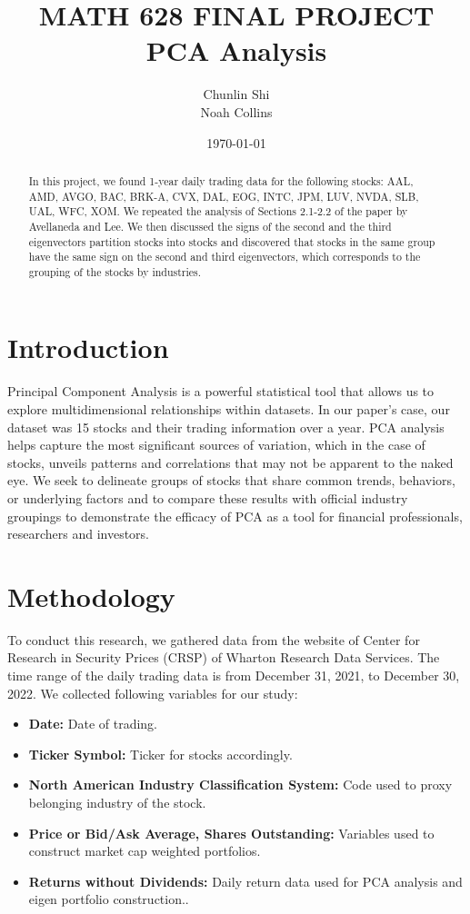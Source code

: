 \documentclass[12pt, letterpaper, twoside]{article}
\title{MATH 628 FINAL PROJECT\\PCA Analysis}
\author{Chunlin Shi\\Noah Collins}
\date{\today}
\begin{document}
    \maketitle

    \begin{abstract}
        In this project, we found 1-year daily trading 
        data for the following stocks: AAL, AMD, 
        AVGO, BAC, BRK-A, CVX, DAL, EOG, INTC, JPM, 
        LUV, NVDA, SLB, UAL, WFC, XOM. 
        We repeated the analysis of 
        Sections 2.1-2.2 of the paper by 
        Avellaneda and Lee. 
        We then discussed the signs of the second 
        and the third eigenvectors partition stocks 
        into stocks and discovered that stocks in the 
        same group have the same sign on the second 
        and third eigenvectors, which corresponds to 
        the grouping of the stocks by industries. 
    \end{abstract}

    \section{Introduction}
    Principal Component Analysis is a powerful statistical 
    tool that allows us to explore multidimensional 
    relationships within datasets. 
    In our paper's case, our dataset was 15 stocks 
    and their trading information over a year. 
    PCA analysis helps capture the most significant 
    sources of variation, which in the case of stocks, 
    unveils patterns and correlations that may not be 
    apparent to the naked eye. We seek to delineate groups
    of stocks that share common trends, behaviors, or 
    underlying factors and to compare these results with 
    official industry groupings to demonstrate the 
    efficacy of PCA as a tool for financial 
    professionals, researchers and investors.

    \section{Methodology}
    To conduct this research, 
    we gathered data from the website of Center for 
    Research in Security Prices (CRSP) of 
    Wharton Research Data Services. 
    The time range of the daily trading data is 
    from December 31, 2021, to December 30, 2022. 
    We collected following variables for our study:

    \begin{itemize}
        \item \textbf{Date:}  Date of trading.
        \item \textbf{Ticker Symbol:} Ticker for stocks accordingly.
        \item \textbf{North American Industry Classification System:} 
        Code used to proxy belonging industry of the stock.
        \item \textbf{Price or Bid/Ask Average, Shares Outstanding:} 
        Variables used to construct market cap weighted 
        portfolios.
        \item \textbf{Returns without Dividends:} 
        Daily return data used for 
        PCA analysis and eigen portfolio construction..
    \end{itemize}
    
\end{document}
